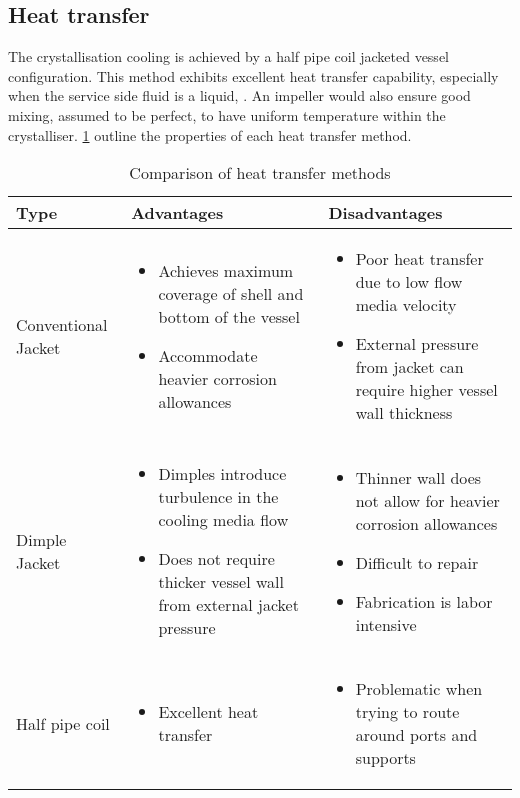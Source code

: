 \subsection{Heat transfer}

The crystallisation cooling is achieved by a half pipe coil jacketed vessel configuration. This method exhibits excellent heat transfer capability, especially when the service side fluid is a liquid, . An impeller would also ensure good mixing, assumed to be perfect, to have uniform temperature within the crystalliser. \ref{tab:heatransfermethodstype} outline the properties of each heat transfer method.

\begin{table}
\caption{Comparison of heat transfer methods \cite{myerson_handbook_2019} }
\label{tab:heatransfermethodstype}
\begin{tabularx}{\linewidth}{XXX}
\toprule
Type & Advantages                 & Disadvantages                               \\ \midrule
Conventional Jacket & \begin{itemize}[label=+,leftmargin=1em]
  \item Achieves maximum coverage of shell and bottom of the vessel
  \item Accommodate heavier corrosion allowances
\end{itemize} & \begin{itemize}[label=-,leftmargin=1em]
  \item Poor heat transfer due to low flow media velocity
  \item External pressure from jacket can require higher vessel wall thickness 
\end{itemize} \\\midrule 
Dimple Jacket & \begin{itemize}[label=+,leftmargin=1em]
  \item Dimples introduce turbulence in the cooling media flow
  \item Does not require thicker vessel wall from external jacket pressure
\end{itemize} & \begin{itemize}[label=-,leftmargin=1em]
  \item Thinner wall does not allow for heavier corrosion allowances
  \item Difficult to repair
  \item Fabrication is labor intensive
\end{itemize} \\\midrule
Half pipe coil  &  \begin{itemize}[label=+,leftmargin=1em]
  \item Excellent heat transfer
\end{itemize} & \begin{itemize}[label=-,leftmargin=1em]
  \item Problematic when trying to route around ports and supports 

\end{itemize}
\\\bottomrule
\end{tabularx}
\end{table}

